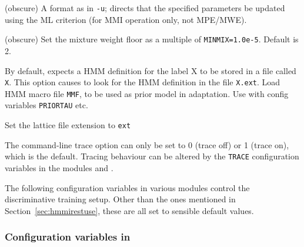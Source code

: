 \begin{optlist}
   (obscure) A format as in \texttt{-u}; directs that the specified parameters
     be updated using the ML criterion (for MMI operation only, not MPE/MWE).

   (obscure) Set the mixture weight floor as a multiple
    of \texttt{MINMIX=1.0e-5}.  Default is 2.

    By default,  expects a HMM definition for 
      the label X to be stored in a file called {\tt X}.  This
      option causes  to look for the HMM definition in the
      file {\tt X.ext}.
\stdoptB
\stdoptF
\stdoptH
{}  Load HMM macro file {\tt MMF}, to be used as prior model in adaptation.  Use with config variables {\tt PRIORTAU} etc.  
\stdoptI
\stdoptM

  Set the lattice file extension to {\tt ext}
\end{optlist}




The command-line trace option can only be set to 0 (trace off)
or 1 (trace on), which is the default.  Tracing behaviour can
be altered by the {\tt TRACE} configuration variables in the modules 
and .


The following configuration variables in various modules control the
discriminative training setup.  Other than the ones mentioned in
Section~\ref{sec:hmmirestuse}, these are all set to sensible default
values.  

\subsubsection{Configuration variables in }


